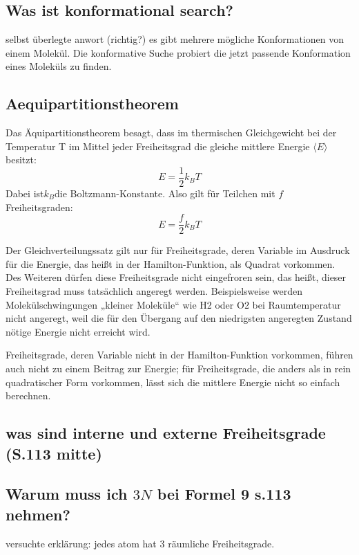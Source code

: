 \documentclass[]{article}
\begin{document}
\subsection{Was ist konformational search?}
selbst überlegte anwort (richtig?) es gibt mehrere mögliche Konformationen von einem Molekül. Die konformative Suche probiert die jetzt passende Konformation eines Moleküls zu finden. 

\subsection{Aequipartitionstheorem}
Das Äquipartitionstheorem besagt, dass im thermischen Gleichgewicht bei der Temperatur T im Mittel jeder Freiheitsgrad die gleiche mittlere Energie $\langle E\rangle $ besitzt:
\begin{equation}
    E =\frac{1}{2} k_{B}T 
\end{equation}
Dabei ist$ k_{B} $die Boltzmann-Konstante. Also gilt für Teilchen mit $f$ Freiheitsgraden:
\begin{equation}
E =\frac{f}{2} k_{B}T
\end{equation}
   
Der Gleichverteilungssatz gilt nur für Freiheitsgrade, deren Variable im Ausdruck für die Energie, das heißt in der Hamilton-Funktion, als Quadrat vorkommen. Des Weiteren dürfen diese Freiheitsgrade nicht \glqq eingefroren \grqq sein, das heißt, dieser Freiheitsgrad muss tatsächlich angeregt werden. Beispielsweise werden Molekülschwingungen „kleiner Moleküle“ wie H2 oder O2 bei Raumtemperatur nicht angeregt, weil die für den Übergang auf den niedrigsten angeregten Zustand nötige Energie nicht erreicht wird.

Freiheitsgrade, deren Variable nicht in der Hamilton-Funktion vorkommen, führen auch nicht zu einem Beitrag zur Energie; für Freiheitsgrade, die anders als in rein quadratischer Form vorkommen, lässt sich die mittlere Energie nicht so einfach berechnen.

\subsection{was sind interne und externe Freiheitsgrade (S.113 mitte)}

\subsection{Warum muss ich $3N$ bei Formel 9 s.113 nehmen?}
versuchte erklärung: jedes atom hat 3 räumliche Freiheitsgrade. 
\end{document}
